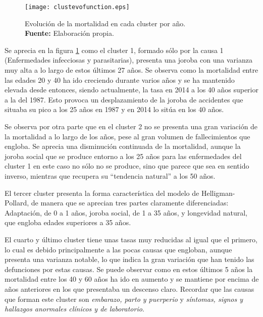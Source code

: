 \documentclass{article}
\begin{document}
\begin{figure}[H]
\centering
\texttt{[image: clustevofunction.eps]}
\caption{\centering Evolución de la mortalidad en cada cluster por año. \\ \textbf{Fuente:} Elaboración propia.}
\label{clustevol}
\end{figure}

Se aprecia en la figura \ref{clustevol} como el cluster 1, formado sólo por la causa 1 (Enfermedades infecciosas y parasitarias), presenta una joroba con una varianza muy alta a lo largo de estos últimos 27 años. Se observa como la mortalidad entre las edades 20 y 40 ha ido creciendo durante varios años y se ha mantenido elevada desde entonces, siendo actualmente, la tasa en 2014 a los 40 años superior a la del 1987. Esto provoca un desplazamiento de la joroba de accidentes que situaba su pico a los 25 años en 1987 y en 2014 lo sitúa en los 40 años. 

\vspace{0.3cm}
Se observa por otra parte que en el cluster 2 no se presenta una gran variación de la mortalidad a lo largo de los años, pese al gran volumen de fallecimientos que engloba. Se aprecia una disminución continuada de la mortalidad, aunque la joroba social que se produce entorno a los 25 años para las enfermedades del cluster 1 en este caso no sólo no se produce, sino que parece que sea en sentido inverso, mientras que recupera su ``tendencia natural'' a los 50 años.

\vspace{0.3cm}
El tercer cluster presenta la forma característica del modelo de Helligman-Pollard, de manera que se aprecian tres partes claramente diferenciadas: Adaptación, de 0 a 1 años, joroba social, de 1 a 35 años, y longevidad natural, que engloba edades superiores a 35 años.

\vspace{0.3cm}
El cuarto y último cluster tiene unas tasas muy reducidas al igual que el primero, lo cual es debido principalmente a las pocas causas que engloban, aunque presenta una varianza notable, lo que indica la gran variación que han tenido las defunciones por estas causas. Se puede observar como en estos últimos 5 años la mortalidad entre los 40 y 60 años ha ido en aumento y se mantiene por encima de años anteriores en los que presentaba un descenso claro. Recordar que las causas que forman este cluster son \emph{embarazo, parto y puerperio} y \emph{síntomas, signos y hallazgos anormales clínicos y de laboratorio}. 
\end{document}
